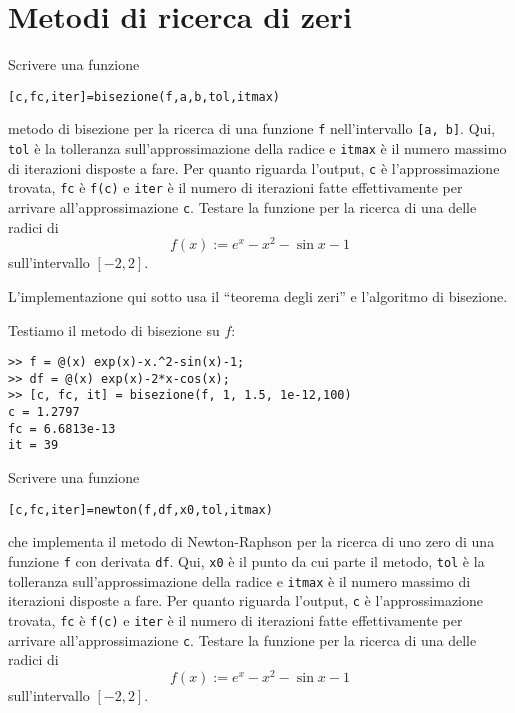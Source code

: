 
\section{Metodi di ricerca di zeri}

\begin{esercizio}
Scrivere una funzione
\begin{center}
\lstinline£[c,fc,iter]=bisezione(f,a,b,tol,itmax)£
\end{center}
metodo di bisezione per la ricerca di una funzione \lstinline£f£ nell'intervallo \lstinline£[a, b]£. Qui, \lstinline£tol£ è la tolleranza sull'approssimazione della radice e \lstinline£itmax£ è il numero massimo di iterazioni disposte a fare. Per quanto riguarda l'output, \lstinline£c£ è l'approssimazione trovata, \lstinline£fc£ è \lstinline£f(c)£ e \lstinline£iter£ è il numero di iterazioni fatte effettivamente per arrivare all'approssimazione \lstinline£c£. Testare la funzione per la ricerca di una delle radici di
\[f(x) := e^x - x^2 - \sin x - 1\]
sull'intervallo \([-2, 2]\).
\end{esercizio}

L'implementazione qui sotto usa il \enquote{teorema degli zeri} e l'algoritmo di bisezione.



Testiamo il metodo di bisezione su \(f\):

\begin{lstlisting}[numbers=none]
>> f = @(x) exp(x)-x.^2-sin(x)-1;
>> df = @(x) exp(x)-2*x-cos(x);
>> [c, fc, it] = bisezione(f, 1, 1.5, 1e-12,100)
c = 1.2797
fc = 6.6813e-13
it = 39
\end{lstlisting}


\begin{esercizio}
Scrivere una funzione
\begin{center}
\lstinline£[c,fc,iter]=newton(f,df,x0,tol,itmax)£
\end{center}
che implementa il metodo di \textenglish{Newton-Raphson} per la ricerca di uno zero di una funzione \lstinline£f£ con derivata \lstinline£df£. Qui, \lstinline£x0£ è il punto da cui parte il metodo, \lstinline£tol£ è la tolleranza sull'approssimazione della radice e \lstinline£itmax£ è il numero massimo di iterazioni disposte a fare. Per quanto riguarda l'output, \lstinline£c£ è l'approssimazione trovata, \lstinline£fc£ è \lstinline£f(c)£ e \lstinline£iter£ è il numero di iterazioni fatte effettivamente per arrivare all'approssimazione \lstinline£c£. Testare la funzione per la ricerca di una delle radici di
\[f(x) := e^x - x^2 - \sin x - 1\]
sull'intervallo \([-2, 2]\).
\end{esercizio}

